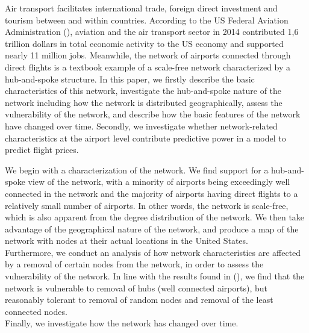 \label{sec:intro}




Air transport facilitates international trade, foreign direct investment and tourism between and within countries. According to the US Federal Aviation Administration (\citet{FAA}), aviation and the air transport sector in 2014 contributed 1,6 trillion dollars in total economic activity to the US economy and supported nearly 11 million jobs. Meanwhile, the network of airports connected through direct flights is a textbook example of a scale-free network characterized by a hub-and-spoke structure. In this paper, we firstly describe the basic characteristics of this network, investigate the hub-and-spoke nature of the network including how the network is distributed geographically, assess the vulnerability of the network, and describe how the basic features of the network have changed over time. Secondly, we investigate whether network-related characteristics at the airport level contribute predictive power in a model to predict flight prices. 

\medskip 

We begin with a characterization of the network. We find support for a hub-and-spoke view of the network, with a minority of airports being exceedingly well connected in the network and the majority of airports having direct flights to a relatively small number of airports. In other words, the network is scale-free, which is also apparent from the degree distribution of the network. We then take advantage of the geographical nature of the network, and produce a map of the network with nodes at their actual locations in the United States. \\ Furthermore, we conduct an analysis of how network characteristics are affected by a removal of certain nodes from the network, in order to assess the vulnerability of the network. In line with the results found in (\cite{chi2004structural}), we find that the network is vulnerable to removal of hubs (well connected airports), but reasonably tolerant to removal of random nodes and removal of the least connected nodes. \\ Finally, we investigate how the network has changed over time. 

